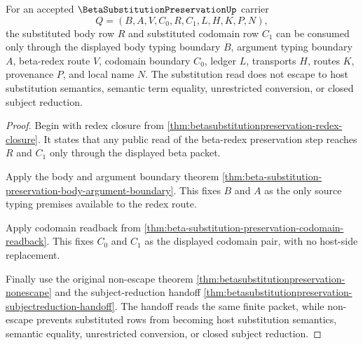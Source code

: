 \begin{theorem}
\label{thm:beta-substitution-preservation-substitution-nonescape}
For an accepted $\BetaSubstitutionPreservationUp$ carrier
$$
Q=(B,A,V,C_0,R,C_1,L,H,K,P,N),
$$
the substituted body row $R$ and substituted codomain row $C_1$ can be consumed only through the displayed body typing boundary $B$, argument typing boundary $A$, beta-redex route $V$, codomain boundary $C_0$, ledger $L$, transports $H$, routes $K$, provenance $P$, and local name $N$. The substitution read does not escape to host substitution semantics, semantic term equality, unrestricted conversion, or closed subject reduction.
\end{theorem}
\begin{proof}
Begin with redex closure from \autoref{thm:betasubstitutionpreservation-redex-closure}. It states that any public read of the beta-redex preservation step reaches $R$ and $C_1$ only through the displayed beta packet.

Apply the body and argument boundary theorem \autoref{thm:beta-substitution-preservation-body-argument-boundary}. This fixes $B$ and $A$ as the only source typing premises available to the redex route.

Apply codomain readback from \autoref{thm:beta-substitution-preservation-codomain-readback}. This fixes $C_0$ and $C_1$ as the displayed codomain pair, with no host-side replacement.

Finally use the original non-escape theorem \autoref{thm:betasubstitutionpreservation-nonescape} and the subject-reduction handoff \autoref{thm:betasubstitutionpreservation-subjectreduction-handoff}. The handoff reads the same finite packet, while non-escape prevents substituted rows from becoming host substitution semantics, semantic equality, unrestricted conversion, or closed subject reduction.
\end{proof}

